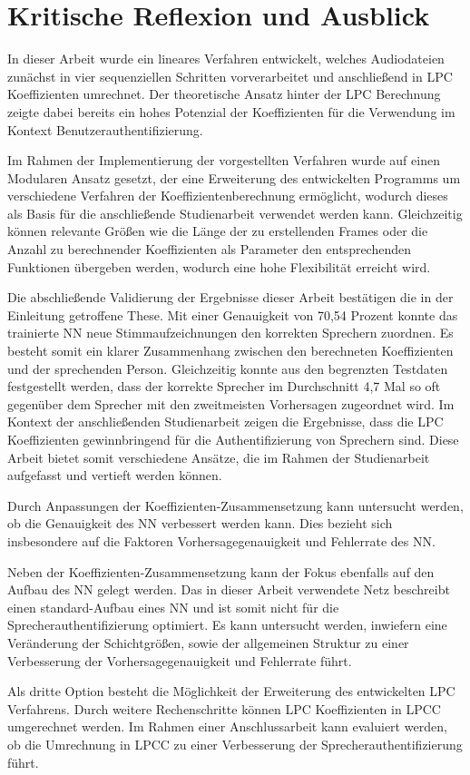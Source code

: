 \section{Kritische Reflexion und Ausblick}\label{sec:Ausblick}
In dieser Arbeit wurde ein lineares Verfahren entwickelt, welches Audiodateien zunächst in vier sequenziellen Schritten vorverarbeitet und anschließend in \ac{LPC} Koeffizienten umrechnet.
Der theoretische Ansatz hinter der \ac{LPC} Berechnung zeigte dabei bereits ein hohes Potenzial der Koeffizienten für die Verwendung im Kontext Benutzerauthentifizierung.

Im Rahmen der Implementierung der vorgestellten Verfahren wurde auf einen Modularen Ansatz gesetzt, der eine Erweiterung des entwickelten Programms um verschiedene Verfahren der Koeffizientenberechnung ermöglicht, wodurch dieses als Basis für die anschließende Studienarbeit verwendet werden kann.
Gleichzeitig können relevante Größen wie die Länge der zu erstellenden Frames oder die Anzahl zu berechnender Koeffizienten als Parameter den entsprechenden Funktionen übergeben werden, wodurch eine hohe Flexibilität erreicht wird.

Die abschließende Validierung der Ergebnisse dieser Arbeit bestätigen die in der Einleitung getroffene These.
Mit einer Genauigkeit von 70,54 Prozent konnte das trainierte \ac{NN} neue Stimmaufzeichnungen den korrekten Sprechern zuordnen.
Es besteht somit ein klarer Zusammenhang zwischen den berechneten Koeffizienten und der sprechenden Person.
Gleichzeitig konnte aus den begrenzten Testdaten festgestellt werden, dass der korrekte Sprecher im Durchschnitt 4,7 Mal so oft gegenüber dem Sprecher mit den zweitmeisten Vorhersagen zugeordnet wird.
\newline
\newline
Im Kontext der anschließenden Studienarbeit zeigen die Ergebnisse, dass die \ac{LPC} Koeffizienten gewinnbringend für die Authentifizierung von Sprechern sind.
Diese Arbeit bietet somit verschiedene Ansätze, die im Rahmen der Studienarbeit aufgefasst und vertieft werden können.

Durch Anpassungen der Koeffizienten-Zusammensetzung kann untersucht werden, ob die Genauigkeit des \ac{NN} verbessert werden kann.
Dies bezieht sich insbesondere auf die Faktoren Vorhersagegenauigkeit und Fehlerrate des \ac{NN}.

Neben der Koeffizienten-Zusammensetzung kann der Fokus ebenfalls auf den Aufbau des \ac{NN} gelegt werden.
Das in dieser Arbeit verwendete Netz beschreibt einen standard-Aufbau eines \ac{NN} und ist somit nicht für die Sprecherauthentifizierung optimiert.
Es kann untersucht werden, inwiefern eine Veränderung der Schichtgrößen, sowie der allgemeinen Struktur zu einer Verbesserung der Vorhersagegenauigkeit und Fehlerrate führt.

Als dritte Option besteht die Möglichkeit der Erweiterung des entwickelten \ac{LPC} Verfahrens.
Durch weitere Rechenschritte können \ac{LPC} Koeffizienten in \ac{LPCC} umgerechnet werden.
Im Rahmen einer Anschlussarbeit kann evaluiert werden, ob die Umrechnung in \ac{LPCC} zu einer Verbesserung der Sprecherauthentifizierung führt.